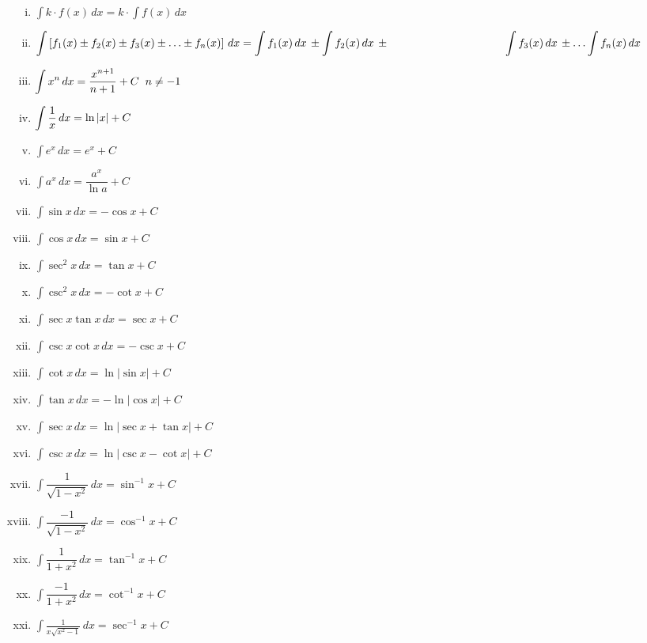 \documentclass{article}
\begin{document}
\begin{enumerate}[i.]
    \item $\displaystyle\int k\cdot f(x) \, dx = k \cdot \displaystyle\int f(x) \, dx$
    \item $\displaystyle\int \left[f_{1}(x)\pm f_{2}(x)\pm f_{3}(x)\pm \ldots \pm f_{n}(x)\right] \, dx= \displaystyle\int f_{1}(x) \, dx \, \pm \displaystyle\int f_{2}(x) \, dx \, \pm \hphantom{1cm}\hspace{3cm} \displaystyle\int f_{3}(x) \, dx \,  \pm \ldots \displaystyle\int f_{n}(x) \, dx$
    \item $\displaystyle\int x^n \, dx=\dfrac{x^{n+1}}{n+1} +C \hfill \hspace{2mm} n \not=-1$
    \item $\displaystyle\int \dfrac{1}{x} \, dx=\ln \abs{x} +C$
    \item $\displaystyle\int e^x \, dx=e^x +C$
    \item $\displaystyle\int a^x \, dx=\dfrac{a^x}{\ln a} +C$
    \item $\displaystyle\int \sin x \, dx=-\cos x +C$
    \item $\displaystyle\int \cos x \, dx=\sin x +C$
    \item $\displaystyle\int \sec^2 x \, dx=\tan x +C$
    \item $\displaystyle\int \csc^2 x \, dx=-\cot x +C$
    \item $\displaystyle\int \sec x \tan x \, dx=\sec x +C$
    \item $\displaystyle\int \csc x \cot x \, dx=-\csc x +C $
    \item $\displaystyle\int \cot x \, dx=\ln |\sin x| +C$
    \item $\displaystyle\int \tan x \, dx=-\ln |\cos x| +C$
    \item $\displaystyle\int \sec x \, dx=\ln |\sec x + \tan x| +C$
    \item $\displaystyle\int \csc x \, dx=\ln |\csc x-\cot x| +C$
    \item $\displaystyle\int \dfrac{1}{\displaystyle\sqrt{1-x^2}} \, dx=\sin^{-1} x +C$
    \item $\displaystyle\int \dfrac{-1}{\displaystyle\sqrt{1-x^2}} \, dx=\cos^{-1} x +C$
    \item $\displaystyle\int \dfrac{1}{1+x^2} \, dx= \tan^{-1} x+C$
    \item $\displaystyle\int \dfrac{-1}{1+x^2} \, dx= \cot^{-1}x +C$
    \item $\displaystyle\int \frac{1}{x\displaystyle\sqrt{x^2-1}} \, dx=\sec^{-1}x +C$

\end{enumerate}
\end{document}
